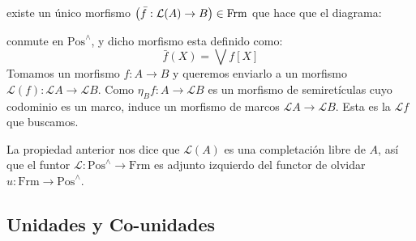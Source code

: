 \documentclass[12pt,letterpaper,titlepage]{article}
\theoremstyle{definition}
\renewcommand\inf{\wedge}
\renewcommand\cal[1]{\mathcal{#1}}
\newcommand\<{\langle}
\renewcommand\>{\rangle}
\newcommand{\Frm}{\mathrm{Frm}}
\newcommand{\Pos}{\mathrm{Pos}}
\begin{document}
\begin{itemize}
    existe un único morfismo $\left(\Bar{f}:\mathcal{L}(A)\to B\right)\in\Frm$ que hace que el diagrama:
    \begin{center}
    \end{center}
    conmute en $\Pos^\inf$, y dicho morfismo esta definido como:
    \begin{equation*}
        \bar{f}(X) = \bigvee f[X]
    \end{equation*}
    Tomamos un morfismo $f:A\to B$ y queremos enviarlo a un morfismo $\mathcal{L}(f):\mathcal{L}A\to\mathcal{L}B$.
    Como $\eta_Bf:A\to\cal LB$ es un morfismo de
    semiretículas cuyo codominio es un marco,
    induce un morfismo de marcos $\cal LA\to\cal LB$.
    Esta es la $\cal Lf$ que buscamos.
    
    La propiedad anterior nos dice que $\mathcal{L}(A)$
    es una completación libre de $A$,
    así que el funtor $\cal L:\Pos^\inf\to\Frm$
    es adjunto izquierdo del functor de olvidar $u:\Frm\to\Pos^\inf$.
\end{itemize}
    
\subsection{Unidades y Co-unidades}
\end{document}
